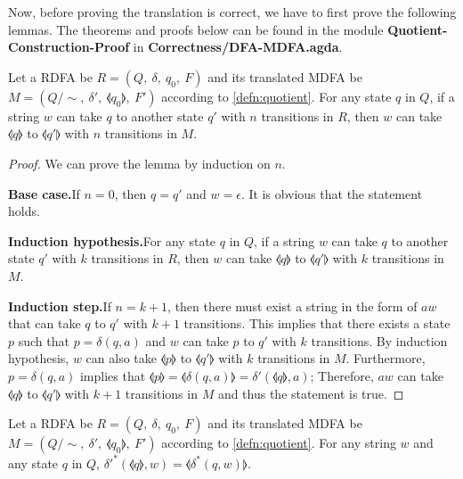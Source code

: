 \par Now, before proving the translation is correct, we have to first prove
the following lemmas. The theorems and proofs below can be found in
the module \textbf{Quotient-Construction-Proof} in \textbf{Correctness/DFA-MDFA.agda}. 

\begin{lem}
\label{lem:rdfa<mdfa}
\noindent Let a RDFA be \(R = (Q,\ \delta,\ q_0,\ F)\) and its
translated MDFA be \(M = (Q/\!\sim,\ \delta',\ \llangle q_0 \rrangle,\
F')\) according to \autoref{defn:quotient}. For any state \(q\) in \(Q\), if a string \(w\) can take \(q\) to another state \(q'\) with \(n\) transitions
in \(R\), then \(w\) can take \(\llangle q \rrangle\) to \(\llangle q'
\rrangle\) with \(n\) transitions in \(M\). 
\end{lem}

\begin{proof}
\noindent We can prove the lemma by induction on \(n\).
\par \noindent \textbf{Base case.}\quad If \(n = 0\), then \(q = q'\)
and \(w = \epsilon\). It is obvious that the statement holds.

\par \noindent \textbf{Induction hypothesis.}\quad For any state \(q\)
in \(Q\), if a string \(w\) can take \(q\) to another state \(q'\)
with \(k\)  transitions
in \(R\), then \(w\) can take \(\llangle q \rrangle\) to \(\llangle q'
\rrangle\) with \(k\) transitions in \(M\). 

\par \noindent \textbf{Induction step.}\quad If \(n = k + 1\), then
there must exist a string in the form of \(aw\) that can take \(q\)
to \(q'\) with \(k + 1\) transitions. This implies that there exists a
state \(p\) such that \(p = \delta(q,a)\) and \(w\) can take \(p\) to \(q'\) with \(k\) transitions. By
induction hypothesis, \(w\) can also take \(\llangle p \rrangle\) to \(\llangle q'
\rrangle\) with \(k\) transitions in \(M\). Furthermore, \(p =
\delta(q,a)\) implies that \(\llangle p \rrangle = \llangle
\delta(q,a) \rrangle = \delta'(\llangle q \rrangle,a)\); Therefore, \(aw\)
can take \(\llangle q \rrangle\) to \(\llangle q' \rrangle\) with \(k
+ 1\) transitions in \(M\) and thus the statement is true. 
\end{proof}

\begin{lem}
\label{lem:rdfa>mdfa}
\noindent Let a RDFA be \(R = (Q,\ \delta,\ q_0,\ F)\) and its
translated MDFA be \(M = (Q/\!\sim,\ \delta',\ \llangle q_0 \rrangle,\
F')\) according to \autoref{defn:quotient}. For any string \(w\) and
any state \(q\) in \(Q\), \(\delta'^*(\llangle q \rrangle,w) = \llangle \delta^*(q,w) \rrangle\). 
\end{lem}

